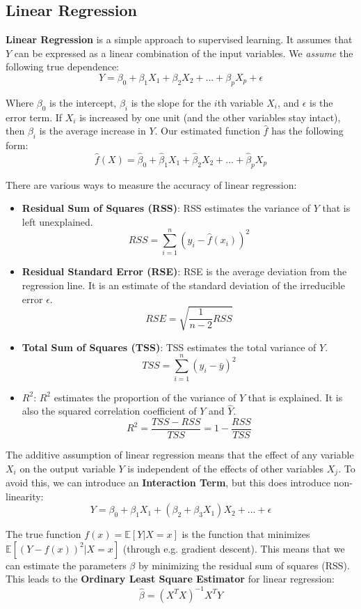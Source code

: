 \documentclass[12pt]{article}
\begin{document}
\newpage
\subsection{Linear Regression}
\textbf{Linear Regression} is a simple approach to supervised learning. It assumes that $Y$ can be expressed as a linear combination of the input variables.
We \textit{assume} the following true dependence:
\[ Y = \beta_0 + \beta_1 X_1 + \beta_2 X_2 + ... + \beta_p X_p + \epsilon \]

\noindent
Where $\beta_0$ is the intercept, $\beta_i$ is the slope for the $i$th variable $X_i$, and $\epsilon$ is the error term.
If $X_i$ is increased by one unit (and the other variables stay intact), then $\beta_i$ is the average increase in $Y$.
Our estimated function $\hat{f}$ has the following form:
\[ \hat{f}(X) = \hat{\beta}_0 + \hat{\beta}_1 X_1 + \hat{\beta}_2 X_2 + ... + \hat{\beta}_p X_p \]

\noindent
There are various ways to measure the accuracy of linear regression:

\begin{itemize}
    \item \textbf{Residual Sum of Squares (RSS)}: RSS estimates the variance of $Y$ that is left unexplained.
    \[ RSS = \sum_{i = 1}^n \left( y_i - \hat{f}(x_i) \right)^2 \]
    \item \textbf{Residual Standard Error (RSE)}: RSE is the average deviation from the regression line. It is an estimate of the standard deviation of the irreducible error $\epsilon$.
    \[ RSE = \sqrt{\frac{1}{n - 2}RSS} \]
    \item \textbf{Total Sum of Squares (TSS)}: TSS estimates the total variance of $Y$.
    \[ TSS = \sum_{i = 1}^n \left( y_i - \bar{y} \right)^2 \]
    \item \textbf{$R^2$}: $R^2$ estimates the proportion of the variance of $Y$ that is explained. It is also the squared correlation coefficient of $Y$ and $\hat{Y}$.
    \[ R^2 = \frac{TSS - RSS}{TSS} = 1 - \frac{RSS}{TSS} \]
\end{itemize}

\noindent
The additive assumption of linear regression means that the effect of any variable $X_i$ on the output variable $Y$ is independent of the effects of other variables $X_j$.
To avoid this, we can introduce an \textbf{Interaction Term}, but this does introduce non-linearity:
\[ Y = \beta_0 + \beta_1 X_1 + (\beta_2 + \beta_3 X_1)X_2 + ... + \epsilon \]

\noindent
The true function $f(x) = \mathbb{E}[Y | X = x]$ is the function that minimizes $\mathbb{E}[\left(Y - f(x)\right)^2 | X = x]$ (through e.g. gradient descent).
This means that we can estimate the parameters $\beta$ by minimizing the residual sum of squares (RSS).
This leads to the \textbf{Ordinary Least Square Estimator} for linear regression:
\[ \hat{\beta} = \left( X^T X \right)^{-1} X^T Y \]
\end{document}
